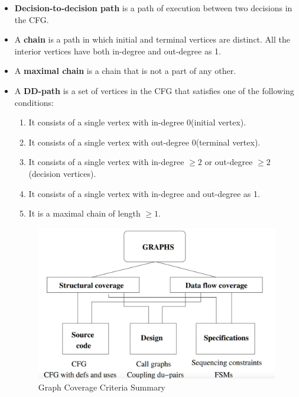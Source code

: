 \documentclass[a4paper]{article}
\begin{document}
\begin{itemize}
    \item \textbf{Decision-to-decision path} is a path of execution between two decisions in the CFG.
    \item A \textbf{chain} is a path in which initial and terminal vertices are distinct. All the interior vertices have both in-degree and out-degree as 1.
    \item A \textbf{maximal chain} is a chain that is not a part of any other.
    \item A \textbf{DD-path} is a set of vertices in the CFG that satisfies one of the following conditions:
    \begin{enumerate}
        \item It consists of a single vertex with in-degree 0(initial vertex).
        \item It consists of a single vertex with out-degree 0(terminal vertex).
        \item It consists of a single vertex with in-degree $\geq 2$ or out-degree $\geq 2$(decision vertices).
        \item It consists of a single vertex with in-degree and out-degree as 1.
        \item It is a maximal chain of length $\geq 1$.
    \end{enumerate}
    \begin{figure}[H]
        \centering
        \includegraphics[width=0.5\linewidth]{Degree//static/ST_Graph_summary.png}
        \caption{Graph Coverage Criteria Summary}
        \label{fig:ST-graph-coverage-summary}
    \end{figure}
\end{itemize}
\end{document}
